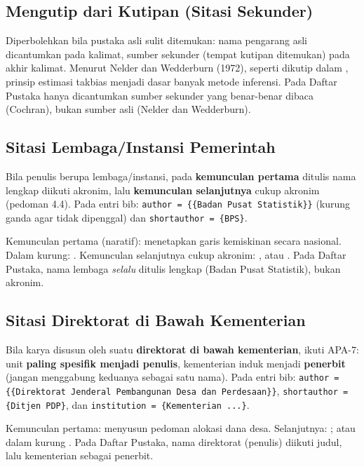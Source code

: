 \subsection{Mengutip dari Kutipan (Sitasi Sekunder)}
Diperbolehkan bila pustaka asli sulit ditemukan: nama pengarang asli dicantumkan
pada kalimat, sumber sekunder (tempat kutipan ditemukan) pada akhir kalimat.
Menurut Nelder dan Wedderburn (1972), seperti dikutip dalam
\textcite{cochran1991}, prinsip estimasi takbias menjadi dasar banyak metode
inferensi. Pada Daftar Pustaka hanya dicantumkan sumber sekunder yang
benar-benar dibaca (Cochran), bukan sumber asli (Nelder dan Wedderburn).

\subsection{Sitasi Lembaga/Instansi Pemerintah}
Bila penulis berupa lembaga/instansi, pada \textbf{kemunculan pertama} ditulis
nama lengkap diikuti akronim, lalu \textbf{kemunculan selanjutnya} cukup akronim
(pedoman 4.4). Pada entri bib: \verb|author = {{Badan Pusat Statistik}}| (kurung
ganda agar tidak dipenggal) dan \verb|shortauthor = {BPS}|.

Kemunculan pertama (naratif): \textcite{bps2024} menetapkan garis kemiskinan
secara nasional. Dalam kurung: \parencite{bps2024}. Kemunculan selanjutnya cukup
akronim: \textcite{bps2024}, atau \parencite{bps2024}. Pada Daftar Pustaka, nama
lembaga \emph{selalu} ditulis lengkap (Badan Pusat Statistik), bukan akronim.

\subsection{Sitasi Direktorat di Bawah Kementerian}
Bila karya disusun oleh suatu \textbf{direktorat di bawah kementerian}, ikuti
APA-7: unit \textbf{paling spesifik menjadi penulis}, kementerian induk menjadi
\textbf{penerbit} (jangan menggabung keduanya sebagai satu nama). Pada entri bib:
\verb|author = {{Direktorat Jenderal Pembangunan Desa dan Perdesaan}}|,
\verb|shortauthor = {Ditjen PDP}|, dan \verb|institution = {Kementerian ...}|.

Kemunculan pertama: \textcite{ditjenpdp2023} menyusun pedoman alokasi dana desa.
Selanjutnya: \textcite{ditjenpdp2023}; atau dalam kurung \parencite{ditjenpdp2023}.
Pada Daftar Pustaka, nama direktorat (penulis) diikuti judul, lalu kementerian
sebagai penerbit.

